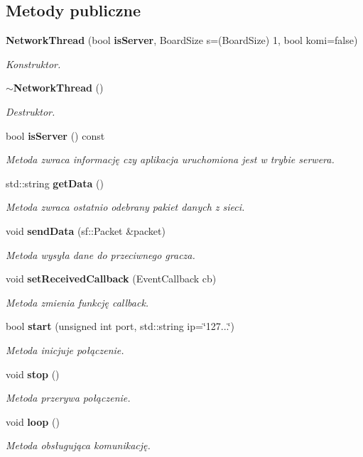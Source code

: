 \subsection*{Metody publiczne}
\begin{DoxyCompactItemize}
\item 
\textbf{ Network\+Thread} (bool \textbf{ is\+Server}, Board\+Size s=(Board\+Size) 1, bool komi=false)
\begin{DoxyCompactList}\small\item\em Konstruktor. \end{DoxyCompactList}\item 
\textbf{ $\sim$\+Network\+Thread} ()
\begin{DoxyCompactList}\small\item\em Destruktor. \end{DoxyCompactList}\item 
bool \textbf{ is\+Server} () const
\begin{DoxyCompactList}\small\item\em Metoda zwraca informację czy aplikacja uruchomiona jest w trybie serwera. \end{DoxyCompactList}\item 
std\+::string \textbf{ get\+Data} ()
\begin{DoxyCompactList}\small\item\em Metoda zwraca ostatnio odebrany pakiet danych z sieci. \end{DoxyCompactList}\item 
void \textbf{ send\+Data} (sf\+::\+Packet \&packet)
\begin{DoxyCompactList}\small\item\em Metoda wysyła dane do przeciwnego gracza. \end{DoxyCompactList}\item 
void \textbf{ set\+Received\+Callback} (Event\+Callback cb)
\begin{DoxyCompactList}\small\item\em Metoda zmienia funkcję callback. \end{DoxyCompactList}\item 
bool \textbf{ start} (unsigned int port, std\+::string ip=\char`\"{}127...\char`\"{})
\begin{DoxyCompactList}\small\item\em Metoda inicjuje połączenie. \end{DoxyCompactList}\item 
void \textbf{ stop} ()
\begin{DoxyCompactList}\small\item\em Metoda przerywa połączenie. \end{DoxyCompactList}\item 
void \textbf{ loop} ()
\begin{DoxyCompactList}\small\item\em Metoda obsługująca komunikację. \end{DoxyCompactList}\end{DoxyCompactItemize}
